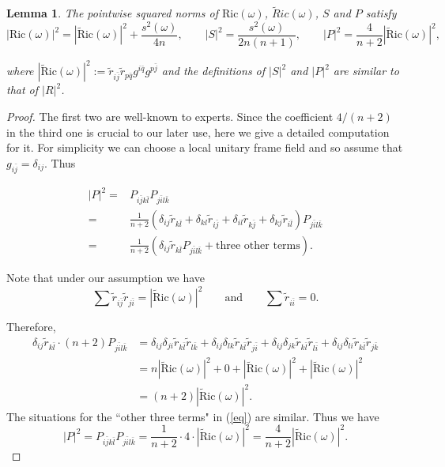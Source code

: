 \documentclass[11pt]{amsart}
\newtheorem{lemma}[theorem]{Lemma}
\theoremstyle{definition}
\theoremstyle{remark}
\numberwithin{equation}{section}
\begin{document}
\begin{lemma}\label{propnorm}
The pointwise squared norms of $\textrm{Ric}(\omega)$,
$\tilde{R}ic(\omega)$, $S$ and $P$ satisfy
\begin{equation}\label{eq0}|\text{Ric}(\omega)|^2=|\tilde{\text{R}}\text{ic}(\omega)|^2+\frac{s^2(\omega)}{4n},\qquad
|S|^2=\frac{s^2(\omega)}{2n(n+1)},\qquad
|P|^2=\frac{4}{n+2}|\tilde{\text{R}}\text{ic}(\omega)|^2,\end{equation}

where $|\tilde{\text{R}}\text{ic}(\omega)|^2:=\tilde{r}_{i\bar{j}}
\tilde{r}_{p\bar{q}}g^{i\bar{q}}g^{p\bar{j}}$ and the definitions of
$|S|^2$ and $|P|^2$ are similar to that of $|R|^2$.
\end{lemma}

\begin{proof}
The first two are well-known to experts. Since the coefficient
$4/(n+2)$ in the third one is crucial to our later use, here we give
a detailed computation for it. For simplicity we can choose a local
unitary frame field and so assume that $g_{i\bar{j}}=\delta_{ij}$.
Thus

\begin{equation}\label{eq}\begin{split}|P|^2=&P_{i\bar{j}k\bar{l}}P_{j\bar{i}l\bar{k}}\\
=&\frac{1}{n+2}(\delta_{ij}\tilde{r}_{k\bar{l}}+
\delta_{kl}\tilde{r}_{i\bar{j}}+\delta_{il}
\tilde{r}_{k\bar{j}}+\delta_{kj}\tilde{r}_{i\bar{l}})P_{j\bar{i}l\bar{k}}\\
=&\frac{1}{n+2}(\delta_{ij}\tilde{r}_{k\bar{l}}P_{j\bar{i}l\bar{k}}+\text{three
other terms}).
\end{split}\end{equation}

Note that under our assumption we have
$$\sum\tilde{r}_{i\bar{j}}\tilde{r}_{j\bar{i}}=|\tilde{\text{R}}\text{ic}(\omega)|^2\qquad
\text{and}\qquad \sum\tilde{r}_{i\bar{i}}=0.$$

Therefore,
 \begin{equation}\begin{split}
\delta_{ij}\tilde{r}_{k\bar{l}}\cdot(n+2)P_{j\bar{i}l\bar{k}}&=
\delta_{ij}\delta_{ji}\tilde{r}_{k\bar{l}}\tilde{r}_{l\bar{k}}+
\delta_{ij}\delta_{lk}\tilde{r}_{k\bar{l}}\tilde{r}_{j\bar{i}}+
\delta_{ij}\delta_{jk}\tilde{r}_{k\bar{l}}\tilde{r}_{l\bar{i}}+
\delta_{ij}\delta_{li}\tilde{r}_{k\bar{l}}\tilde{r}_{j\bar{k}}\\
&=n|\tilde{\text{R}}\text{ic}(\omega)|^2+0+|\tilde{\text{R}}\text{ic}(\omega)|^2
+|\tilde{\text{R}}\text{ic}(\omega)|^2\\
&=(n+2)|\tilde{\text{R}}\text{ic}(\omega)|^2.\end{split}\nonumber\end{equation}
The situations for the ``other three terms" in (\ref{eq}) are
similar. Thus we have
$$|P|^2=P_{i\bar{j}k\bar{l}}P_{j\bar{i}l\bar{k}}=
\frac{1}{n+2}\cdot4\cdot|\tilde{\text{R}}\text{ic}(\omega)|^2=
\frac{4}{n+2}|\tilde{\text{R}}\text{ic}(\omega)|^2.$$
\end{proof}
\end{document}
